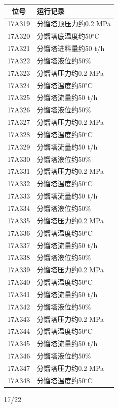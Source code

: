 \documentclass[UTF8,10pt,a4paper,fontset=fandol]{ctexart}
\newcommand{\handwritten}[1]{#1}
\begin{document}
\begin{center}
\begin{minipage}[t]{0.47\textwidth}
\begin{tabularx}{\linewidth}{|c|>{\RaggedRight\arraybackslash}X|}
\hline
\textbf{位号} & \textbf{运行记录} \\ \hline
17A319 & 分馏塔顶压力约0.2 MPa \\ \hline
17A320 & 分馏塔底温度约50$^\circ$C \\ \hline
17A321 & 分馏塔进料量约50 t/h \\ \hline
17A322 & 分馏塔液位约50\% \\ \hline
17A323 & 分馏塔压力约0.2 MPa \\ \hline
17A324 & 分馏塔温度约50$^\circ$C \\ \hline
17A325 & 分馏塔流量约50 t/h \\ \hline
17A326 & 分馏塔液位约50\% \\ \hline
17A327 & 分馏塔压力约0.2 MPa \\ \hline
17A328 & 分馏塔温度约50$^\circ$C \\ \hline
17A329 & 分馏塔流量约50 t/h \\ \hline
17A330 & 分馏塔液位约50\% \\ \hline
17A331 & 分馏塔压力约0.2 MPa \\ \hline
17A332 & 分馏塔温度约50$^\circ$C \\ \hline
17A333 & 分馏塔流量约50 t/h \\ \hline
17A334 & 分馏塔液位约50\% \\ \hline
17A335 & 分馏塔压力约0.2 MPa \\ \hline
17A336 & 分馏塔温度约50$^\circ$C \\ \hline
17A337 & 分馏塔流量约50 t/h \\ \hline
17A338 & 分馏塔液位约50\% \\ \hline
17A339 & 分馏塔压力约0.2 MPa \\ \hline
17A340 & 分馏塔温度约50$^\circ$C \\ \hline
17A341 & 分馏塔流量约50 t/h \\ \hline
17A342 & 分馏塔液位约50\% \\ \hline
17A343 & 分馏塔压力约0.2 MPa \\ \hline
17A344 & 分馏塔温度约50$^\circ$C \\ \hline
17A345 & 分馏塔流量约50 t/h \\ \hline
17A346 & 分馏塔液位约50\% \\ \hline
17A347 & 分馏塔压力约0.2 MPa \\ \hline
17A348 & 分馏塔温度约50$^\circ$C \\ \hline
\end{tabularx}
\end{minipage}

\vfill

\handwritten{17/22}

\end{center}
\end{document}

